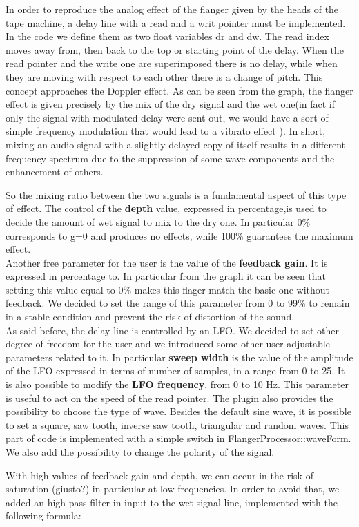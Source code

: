 In order to reproduce the analog effect of the flanger given by the heads of the tape machine, a delay line with a read and a writ pointer must be implemented. In the code we define them as two float variables dr and dw. The read index moves away from, then back to the top or starting point of the delay. When the read pointer and the write one are superimposed there is no delay, while when they are moving with respect to each other there is a change of pitch. This concept approaches the Doppler effect. As can be seen from the graph, the flanger effect is given precisely by the mix of the dry signal and the wet one(in fact if only the signal with modulated delay were sent out, we would have a sort of simple frequency modulation that would lead to a vibrato effect ). In short, mixing an audio signal with a slightly delayed copy of itself results in a different frequency spectrum due to the suppression of some wave components and the enhancement of others.\par
So the mixing ratio between the two signals is a fundamental aspect of this type of effect. The control of the \textbf{depth} value, expressed in percentage,is used to decide the amount of wet signal to mix to the dry one. In particular 0\% corresponds to g=0 and produces no effects, while 100\% guarantees the maximum effect.\\
Another free parameter for the user is the value of the \textbf{feedback gain}. It is expressed in percentage to. In particular from the graph it can be seen that setting this value equal to 0\% makes this flager match the basic one without feedback. We decided to set the range of this parameter from 0 to 99\% to remain in a stable condition and prevent the risk of distortion of the sound.\\
As said before, the delay line is controlled by an LFO. We decided to set other degree of freedom for the user and we introduced some other user-adjustable parameters related to it. In particular \textbf{sweep width} is the value of the amplitude of the LFO expressed in terms of number of samples, in a range from  0 to 25. It is also possible to modify the \textbf{LFO frequency}, from 0 to 10 Hz. This parameter is useful to act on the speed of the read pointer. The plugin also provides the possibility to choose the type of wave. Besides the default sine wave, it is possible to set a square, saw tooth, inverse saw tooth, triangular and random waves. This part of code is implemented with a simple switch in FlangerProcessor::waveForm.
We also add the possibility to change the polarity of the signal.

With high values of feedback gain and depth, we can occur in the risk of saturation (giusto?) in particular at low frequencies. In order to avoid that, we added an high pass filter in input to the wet signal line, implemented with the following formula:




